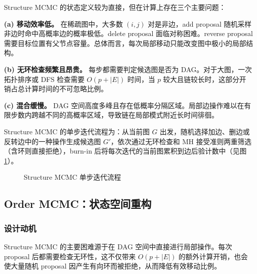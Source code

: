 \documentclass[UTF8,a4paper,12pt]{ctexart}
\begin{document}
Structure MCMC 的状态定义较为直接，但在计算上存在三个主要问题：

\textbf{(a) 移动效率低。} 在稀疏图中，大多数 $(i, j)$ 对是非边，add proposal 随机采样非边时命中高概率边的概率极低。delete proposal 面临对称困难。reverse proposal 需要目标位置有父节点容量。总体而言，每次局部移动只能改变图中极小的局部结构。

\textbf{(b) 无环检查频繁且昂贵。} 每步都需要判定候选图是否为 DAG。对于大图，一次拓扑排序或 DFS 检查需要 $O(p + |E|)$ 时间，当 $p$ 较大且链较长时，这部分开销占总计算时间的不可忽略比例。

\textbf{(c) 混合缓慢。} DAG 空间高度多峰且存在低概率分隔区域。局部边操作难以在有限步数内跨越不同的高概率区域，导致链在局部模式附近长时间徘徊。

Structure MCMC 的单步迭代流程为：从当前图 $G$ 出发，随机选择加边、删边或反转边中的一种操作生成候选图 $G'$，依次通过无环检查和 MH 接受准则两重筛选（含环则直接拒绝），burn-in 后将每次迭代的当前图累积到边后验计数中（见图 \ref{fig:structure_mechanism}）。

\begin{figure}[htbp]
\centering
{}
\caption{Structure MCMC 单步迭代流程}
\label{fig:structure_mechanism}
\end{figure}

\subsection{Order MCMC：状态空间重构}

\subsubsection{设计动机}

Structure MCMC 的主要困难源于在 DAG 空间中直接进行局部操作。每次 proposal 后都需要检查无环性，这不仅带来 $O(p+|E|)$ 的额外计算开销，也会使大量随机 proposal 因产生有向环而被拒绝，从而降低有效移动比例。
\end{document}
